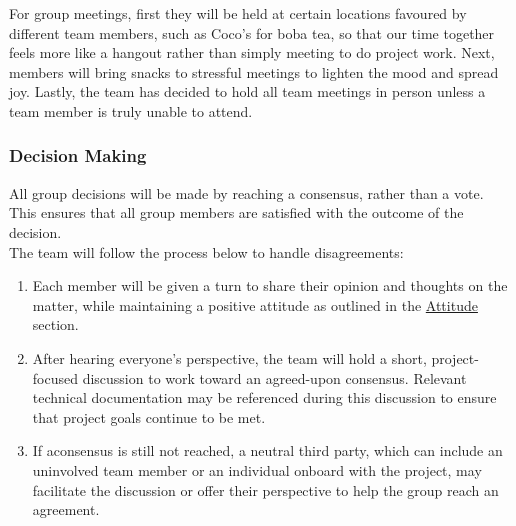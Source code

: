 \documentclass{article}
\begin{document}
For group meetings, first they will be held at certain locations favoured by different team members, such as Coco’s for boba tea, so that our time together feels more like a hangout rather than simply meeting to do project work. 
Next, members will bring snacks to stressful meetings to lighten the mood and spread joy. 
Lastly, the team has decided to hold all team meetings in person unless a team member is truly unable to attend.

\subsubsection*{Decision Making} 

All group decisions will be made by reaching a consensus, rather than a vote. This ensures that all group members are satisfied with the outcome of the decision. \\

\noindent The team will follow the process below to handle disagreements:
\begin{enumerate}
    \item Each member will be given a turn to share their opinion and thoughts on the matter, while maintaining a positive attitude as outlined in the \hyperref[sec:Attitude]{Attitude} section. 
    \item After hearing everyone’s perspective, the team will hold a short, project-focused discussion to work toward an agreed-upon consensus. Relevant technical documentation may be referenced during this discussion to ensure that project goals continue to be met.
    \item If aconsensus is still not reached, a neutral third party, which can include an uninvolved team member or an individual onboard with the project, may facilitate the discussion or offer their perspective to help the group reach an agreement.
\end{enumerate}
\end{document}
